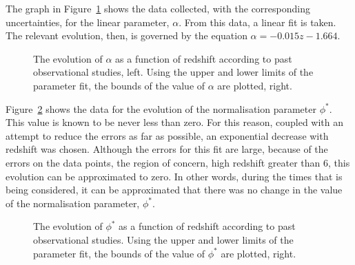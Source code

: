 			The graph in Figure~\ref{fig:alpha_evolution} shows the data collected, with the corresponding uncertainties, for the linear parameter, $\alpha$. From this data, a linear fit is taken. The relevant evolution, then, is governed by the equation $\alpha = -0.015z - 1.664$.
			\begin{figure}[!htbp]
				\begin{minipage}[c]{0.5\linewidth}
					\centering
						\begingroup{}
							\resizebox{\textwidth}{!}{%
								
							}\endgroup
				\end{minipage}
				\begin{minipage}[c]{0.5\linewidth}
					\centering
						\begingroup{}
							\resizebox{\textwidth}{!}{%
								
							}\endgroup
				\end{minipage}
				\caption{The evolution of $\alpha$ as a function of redshift according to past observational studies, left. Using the upper and lower limits of the parameter fit, the bounds of the value of $\alpha$ are plotted, right.\label{fig:alpha_evolution}}
			\end{figure}

			Figure~\ref{fig:phi_evolution} shows the data for the evolution of the normalisation parameter $\phi^{*}$. This value is known to be never less than zero. For this reason, coupled with an attempt to reduce the errors as far as possible, an exponential decrease with redshift was chosen. Although the errors for this fit are large, because of the errors on the data points, the region of concern, high redshift greater than 6, this evolution can be approximated to zero. In other words, during the times that is being considered, it can be approximated that there was no change in the value of the normalisation parameter, $\phi^*$.
			\begin{figure}[!htbp]
				\begin{minipage}[c]{0.5\linewidth}
					\centering
						\begingroup{}
							\resizebox{\textwidth}{!}{%
								
							}\endgroup
				\end{minipage}
				\begin{minipage}[c]{0.5\linewidth}
					\centering
						\begingroup{}
							\resizebox{\textwidth}{!}{%
								
							}\endgroup
				\end{minipage}
				\caption{The evolution of $\phi^{*}$ as a function of redshift according to past observational studies. Using the upper and lower limits of the parameter fit, the bounds of the value of $\phi^*$ are plotted, right.\label{fig:phi_evolution}}
			\end{figure}

